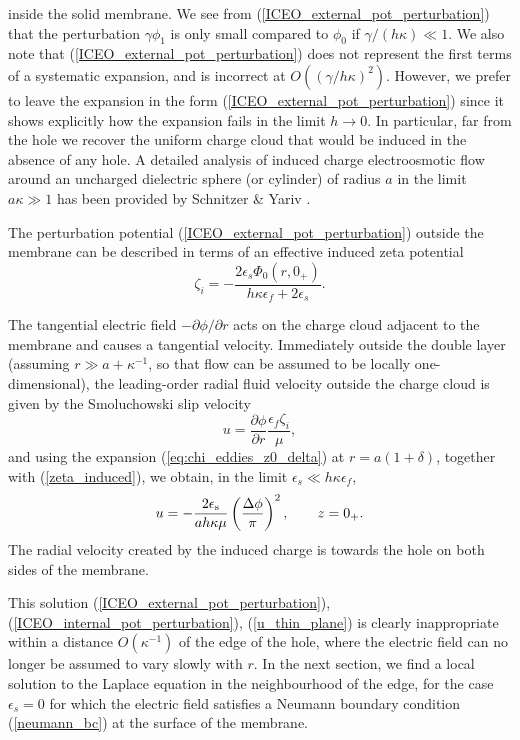 inside the solid membrane. We see from (\ref{ICEO_external_pot_perturbation})
that the perturbation $\gamma\phi_1$ is only small compared to $\phi_0$
if $\gamma/(h\kappa)\ll 1$. 
We also note that
(\ref{ICEO_external_pot_perturbation})
does not represent the first terms of a systematic expansion,
and is incorrect at $O((\gamma/h\kappa)^2)$.
However, we prefer to leave the expansion in
the form (\ref{ICEO_external_pot_perturbation}) since it shows explicitly
how the expansion fails in the limit $h\rightarrow 0$.
In particular, far from the hole we recover the
uniform charge cloud that would be induced in the absence of any hole.
A detailed analysis
of induced charge electroosmotic flow around
an uncharged dielectric
sphere (or cylinder)
of radius $a$ in the limit $a\kappa\gg 1$ has been provided by Schnitzer \&
Yariv \cite{schnitzer2014strong}.

The perturbation potential (\ref{ICEO_external_pot_perturbation})
outside the membrane can be described in terms of an
effective induced zeta potential
\begin{equation}
\zeta_i=-\frac{2\epsilon_s\Phi_0(r,0_+)}{h\kappa\epsilon_f+2\epsilon_s}.
\label{zeta_induced}
\end{equation}

The tangential electric field $-\partial\phi/\partial r$ acts on
the charge cloud adjacent to the membrane and causes a tangential
velocity. Immediately outside the double layer
(assuming $r\gg a+\kappa^{-1}$, so that
flow can be assumed to be locally one-dimensional), the leading-order 
radial fluid
velocity outside the charge cloud is given by the Smoluchowski slip velocity
\begin{equation}
u=\frac{\partial\phi}{\partial r}\frac{\epsilon_f\zeta_i}{\mu},
\end{equation}
and using the expansion (\ref{eq:chi_eddies_z0_delta}) at $r=a(1+\delta)$,
together with
(\ref{zeta_induced}), we obtain, in the limit $\epsilon_s\ll h\kappa\epsilon_f$,
\begin{equation}
u=-\frac{2\epsilon_\text{s}}{ah\kappa\mu}\left(\frac{\Delta\phi}{\pi}\right)^2
,\hskip 20pt z=0_+.
\label{u_thin_plane}
\end{equation}
The radial velocity created by the induced charge is towards the hole
on both sides of the membrane.

This solution (\ref{ICEO_external_pot_perturbation}),
(\ref{ICEO_internal_pot_perturbation}), (\ref{u_thin_plane})
is clearly inappropriate within a distance $O(\kappa^{-1})$ of the
edge of the hole, where the electric field can
no longer be assumed to vary slowly with $r$.
In the next section, we find a local solution
to the Laplace equation in the neighbourhood of the edge,
for the case $\epsilon_s=0$ for which the electric field
satisfies a Neumann boundary condition (\ref{neumann_bc})
at the surface of the membrane.

